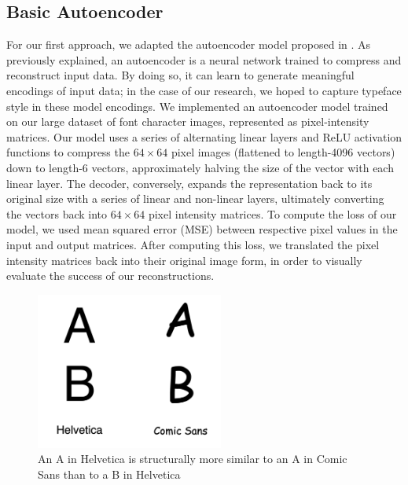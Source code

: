 \subsection{Basic Autoencoder} \label{basic-autoencoder-2}

For our first approach, we adapted the autoencoder model proposed in \cite{rumelhart1986}. As previously explained, an autoencoder is a neural network trained to compress and reconstruct input data. By doing so, it can learn to generate meaningful encodings of input data; in the case of our research, we hoped to capture typeface style in these model encodings. We implemented an autoencoder model trained on our large dataset of font character images, represented as pixel-intensity matrices. Our model uses a series of alternating linear layers and ReLU activation functions to compress the $64 \times 64$ pixel images (flattened to length-4096 vectors) down to length-6 vectors, approximately halving the size of the vector with each linear layer. The decoder, conversely, expands the representation back to its original size with a series of linear and non-linear layers, ultimately converting the vectors back into $64 \times 64$ pixel intensity matrices. To compute the loss of our model, we used mean squared error (MSE) between respective pixel values in the input and output matrices. After computing this loss, we translated the pixel intensity matrices back into their original image form, in order to visually evaluate the success of our reconstructions.

\begin{figure}[]
    \centering
    \includegraphics[width=0.55\textwidth]{images/ab-cs-helvetica.png}
    \caption{An { A} in Helvetica is structurally more similar to an { A} in Comic Sans than to a { B} in Helvetica}
    \label{fig:ab-cs-helvetica}
\end{figure}

